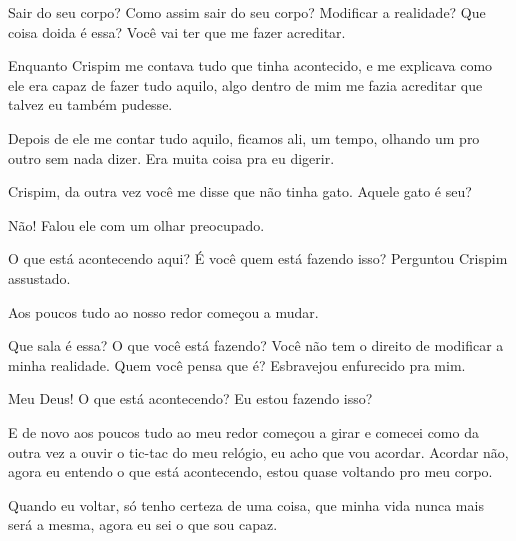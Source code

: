 Sair do seu corpo? Como assim sair do seu corpo? Modificar a realidade? Que coisa doida é essa? Você vai ter que me fazer acreditar.

Enquanto Crispim me contava tudo que tinha acontecido, e me explicava como ele era capaz de fazer tudo aquilo, algo dentro de mim me fazia acreditar que talvez eu também pudesse.

Depois de ele me contar tudo aquilo, ficamos ali, um tempo, olhando um pro outro sem nada dizer. Era muita coisa pra eu digerir.

Crispim, da outra vez você me disse que não tinha gato. Aquele gato é seu?

Não! Falou ele com um olhar preocupado.

O que está acontecendo aqui? É você quem está fazendo isso? Perguntou Crispim assustado.

Aos poucos tudo ao nosso redor começou a mudar.

Que sala é essa? O que você está fazendo? Você não tem o direito de modificar a minha realidade. Quem você pensa que é? Esbravejou enfurecido pra mim.

Meu Deus! O que está acontecendo? Eu estou fazendo isso?

E de novo aos poucos tudo ao meu redor começou a girar e comecei como da outra vez a ouvir o tic-tac do meu relógio, eu acho que vou acordar. Acordar não, agora eu entendo o que está acontecendo, estou quase voltando pro meu corpo.

Quando eu voltar, só tenho certeza de uma coisa, que minha vida nunca mais será a mesma, agora eu sei o que sou capaz.


